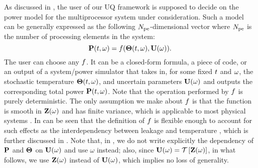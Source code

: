 As discussed in , the user of our UQ framework is supposed to decide on the power model for the multiprocessor system under consideration. Such a model can be generally expressed as the following ${N_\text{pe}}$-dimensional vector where ${N_\text{pe}}$ is the number of processing elements in the system:
\begin{equation} \elabel{power-model}
  \vP(\t, \o) = \f(\vTO(\t, \o), \vU(\o)).
\end{equation}
The user can choose any $f$. It can be a closed-form formula, a piece of code, or an output of a system/power simulator that takes in, for some fixed $t$ and $\omega$, the stochastic temperature ${\boldsymbol\Theta}(t, \omega)$, and uncertain parameters $\mathbf{U}(\omega)$ and outputs the corresponding total power $\mathbf{P}(t, \omega)$. Note that the operation performed by $f$ is purely deterministic. The only assumption we make about $f$ is that the function is smooth in $\mathbf{Z}(\omega)$ and has finite variance, which is applicable to most physical systems \cite{xiu2002}. In can be seen that the definition of $f$ is flexible enough to account for such effects as the interdependency between leakage and temperature \cite{srivastava2010, liu2007}, which is further discussed in . Note that, in , we do not write explicitly the dependency of $\mathbf{P}$ and ${\boldsymbol\Theta}$ on $\mathbf{U}(\omega)$ and use $\omega$ instead; also, since $\vU(\o) = \oTransform{\vZ(\o)}$, in what follows, we use $\mathbf{Z}(\omega)$ instead of $\mathbf{U}(\omega)$, which implies no loss of generality.
